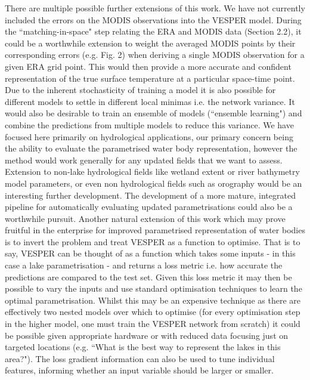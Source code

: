 \documentclass[hess, manuscript]{copernicus}
\begin{document}
There are multiple possible further extensions of this work. We have not currently included the errors on the MODIS observations into the VESPER model. During the “matching-in-space" step relating the ERA and MODIS data (Section 2.2), it could be a worthwhile extension to weight the averaged MODIS points by their corresponding errors (e.g. Fig. 2) when deriving a single MODIS observation for a given ERA grid point. This would then provide a more accurate and confident representation of the true surface temperature at a particular space-time point. Due to the inherent stochasticity of training a model it is also possible for different models to settle in different local minimas i.e. the network variance. It would also be desirable to train an ensemble of models (“ensemble learning") and combine the predictions from multiple models to reduce this variance. We have focused here primarily on hydrological applications, our primary concern being the ability to evaluate the parametrised water body representation, however the method would work generally for any updated fields that we want to assess. Extension to non-lake hydrological fields like wetland extent or river bathymetry model parameters, or even non hydrological fields such as orography would be an interesting further development. The development of a more mature, integrated pipeline for automatically evaluating updated parametrisations could also be a worthwhile pursuit. Another natural extension of this work which may prove fruitful in the enterprise for improved parametrised representation of water bodies is to invert the problem and treat VESPER as a function to optimise. That is to say, VESPER can be thought of as a function which takes some inputs - in this case a lake parametrisation - and returns a loss metric i.e. how accurate the predictions are compared to the test set. Given this loss metric it may then be possible to vary the inputs and use standard optimisation techniques to learn the optimal parametrisation. Whilst this may be an expensive technique as there are effectively two nested models over which to optimise (for every optimisation step in the higher model, one must train the VESPER network from scratch) it could be possible given appropriate hardware or with reduced data focusing just on targeted locations (e.g. “What is the best way to represent the lakes in this area?"). The loss gradient information can also be used to tune individual features, informing whether an input variable should be larger or smaller.
\end{document}
